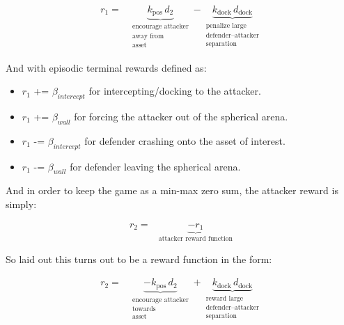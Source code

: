 \begin{equation}
\label{eq:attacker_step_reward}
\boxed{
\begin{aligned}
r_1
= {}&
\underbrace{k_{\text{pos}}\, d_2}_{\substack{\text{encourage attacker}\\\text{away from}\\\text{asset}}}
-
\underbrace{k_{\text{dock}}\, d_{\text{dock}}}_{\substack{\text{penalize large}\\\text{defender--attacker}\\\text{separation}}}
\end{aligned}
}
\end{equation}



And with episodic terminal rewards defined as:

\begin{itemize}
    \item $r_1$ += $\beta_{intercept}$ for intercepting/docking to the attacker.
    \item $r_1$ += $\beta_{wall}$ for forcing the attacker out of the spherical arena.
    \item $r_1$ -= $\beta_{intercept}$ for defender crashing onto the asset of interest.
    \item $r_1$ -= $\beta_{wall}$ for defender leaving the spherical arena.
    
\end{itemize}

And in order to keep the game as a min-max zero sum, the attacker reward is simply: 

\[
\boxed{
\begin{aligned}
r_2
= {}&
\underbrace{-r_1}_{\text{attacker reward function}}
\end{aligned}
}
\]

So laid out this turns out to be a reward function in the form:

\begin{equation}
\label{eq:defender_step_reward}
\boxed{
\begin{aligned}
r_2
= {}&
\underbrace{-k_{\text{pos}}\, d_2}_{\substack{\text{encourage attacker}\\\text{towards}\\\text{asset}}}
+
\underbrace{k_{\text{dock}}\, d_{\text{dock}}}_{\substack{\text{reward large}\\\text{defender--attacker}\\\text{separation}}}
\end{aligned}
}
\end{equation}

